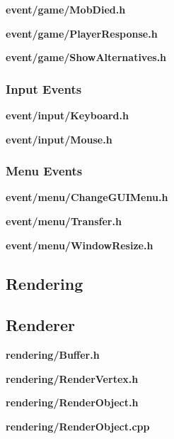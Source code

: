 \documentclass[../Main.tex]{subfiles}
\begin{document}
            \textbf{event/game/MobDied.h}
            

            \textbf{event/game/PlayerResponse.h}
            

            \textbf{event/game/ShowAlternatives.h}
            

        \subsubsection{Input Events}
            \textbf{event/input/Keyboard.h}
            

            \textbf{event/input/Mouse.h}
            

        \subsubsection{Menu Events}
            \textbf{event/menu/ChangeGUIMenu.h}
            

            \textbf{event/menu/Transfer.h}
            

            \textbf{event/menu/WindowResize.h}
            

    \subsection{Rendering}
        \subsection{Renderer}
            \textbf{rendering/Buffer.h}
            

            \textbf{rendering/RenderVertex.h}
            

            \textbf{rendering/RenderObject.h}
            
            \textbf{rendering/RenderObject.cpp}
            
\end{document}
